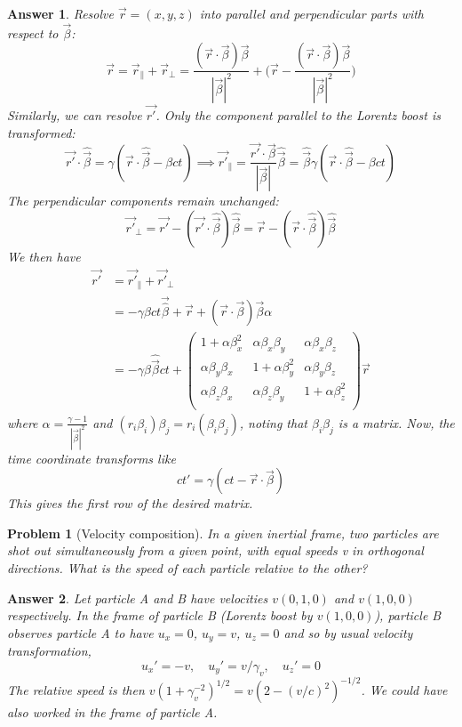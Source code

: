\documentclass[a4paper]{article}
\theoremstyle{new2}
\newtheorem{ans}{Answer}[section]
\theoremstyle{new}
\newtheorem{qns}{Problem}[section]
\begin{document}
\begin{ans}
Resolve $\vec{r}=(x,y,z)$ into parallel and perpendicular parts with respect to $\vec{\beta}$:
$$\vec{r}=\vec{r}_\parallel+\vec{r}_\perp=\frac{(\vec{r}\cdot\vec{\beta})\vec{\beta}}{|\vec{\beta}|^2}+\bigg(\vec{r}-\frac{(\vec{r}\cdot\vec{\beta})\vec{\beta}}{|\vec{\beta}|^2}\bigg)$$
Similarly, we can resolve $\vec{r'}$. Only the component parallel to the Lorentz boost is transformed:
$$\vec{r'}\cdot\hat{\vec{\beta}}=\gamma(\vec{r}\cdot\hat{\vec{\beta}}-\beta ct)\implies\vec{r'}_\parallel=\frac{\vec{r'}\cdot\vec{\beta}}{|\vec{\beta}|}\hat{\vec{\beta}}=\hat{\vec{\beta}}\gamma(\vec{r}\cdot\hat{\vec{\beta}}-\beta ct)$$
The perpendicular components remain unchanged:
$$\vec{r'}_\perp=\vec{r'}-(\vec{r'}\cdot\hat{\vec{\beta}})\hat{\vec{\beta}}=\vec{r}-(\vec{r}\cdot\hat{\vec{\beta}})\hat{\vec{\beta}}$$
We then have
\begin{align}
    \vec{r'}&=\vec{r'}_\parallel+\vec{r'}_\perp\nonumber\\&=-\gamma\beta ct\vec{\hat{\beta}}+\vec{r}+(\vec{r}\cdot\vec{\beta})\vec{\beta}\alpha\nonumber\\&=-\gamma\beta \hat{\vec{\beta}}ct+\begin{pmatrix}1+\alpha\beta_x^2&\alpha\beta_x\beta_y&\alpha\beta_x\beta_z\\\alpha\beta_y\beta_x&1+\alpha\beta_y^2&\alpha\beta_y\beta_z\\\alpha\beta_z\beta_x&\alpha\beta_z\beta_y&1+\alpha\beta_z^2\\\end{pmatrix}\vec{r}\nonumber
\end{align}
where $\alpha=\frac{\gamma-1}{|\vec{\beta}|^2}$ and $(r_i\beta_i)\beta_j=r_i(\beta_i\beta_j)$, noting that $\beta_i\beta_j$ is a matrix. Now, the time coordinate transforms like
$$ct'=\gamma(ct-\vec{r}\cdot\vec{\beta})$$
This gives the first row of the desired matrix.
\end{ans}
\newpage
\begin{qns}[Velocity composition]
In a given inertial frame, two particles are shot out simultaneously from a given
point, with equal speeds v in orthogonal directions. What is the speed of each particle
relative to the other?
\end{qns}
\begin{ans}
Let particle A and B have velocities $v(0,1,0)$ and $v(1,0,0)$ respectively. In the frame of particle B (Lorentz boost by $v(1,0,0)$), particle B observes particle A to have $u_x=0$, $u_y=v$, $u_z=0$ and so by usual velocity transformation,
$$u_x'=-v,\quad u_y'=v/\gamma_v,\quad u_z'=0$$
The relative speed is then $v(1+\gamma_v^{-2})^{1/2}=v(2-(v/c)^2)^{-1/2}$. We could have also worked in the frame of particle A.
\end{ans}
\end{document}
